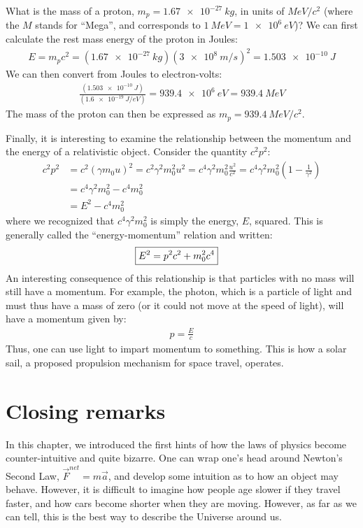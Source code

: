 \begin{example}{What is the mass of a proton, $m_p=\SI{1.67e-27}{kg}$, in units of $\si{MeV/c^2}$ (where the $M$ stands for ``Mega'', and corresponds to $\SI{1}{MeV}=\SI{1e6}{eV}$)?}
We can first calculate the rest mass energy of the proton in Joules:
\begin{align*}
E=m_pc^2=(\SI{1.67e-27}{kg})(\SI{3e8}{m/s})^2=\SI{1.503e-10}{J}
\end{align*}
We can then convert from Joules to electron-volts:
\begin{align*}
\frac{(\SI{1.503e-10}{J})}{(\SI{1.6e-19}{J/eV})}=\SI{939.4e6}{eV}=\SI{939.4}{MeV}
\end{align*}
The mass of the proton can then be expressed as $m_p=\SI{939.4}{MeV/c^2}$.
\end{example}

Finally, it is interesting to examine the relationship between the momentum and the energy of a relativistic object. Consider the quantity $c^2p^2$:
\begin{align*}
c^2p^2 &= c^2(\gamma m_0 u)^2=c^2\gamma^2m_0^2u^2=c^4\gamma^2m_0^2\frac{u^2}{c^2}=c^4\gamma^2m_0^2\left(1- \frac{1}{\gamma^2}\right)\\
&=c^4\gamma^2m_0^2 - c^4m_0^2\\
&=E^2-c^4m_0^2
\end{align*}
where we recognized that $c^4\gamma^2m_0^2$ is simply the energy, $E$, squared. This is generally called the ``energy-momentum'' relation and written:
\begin{align*}
\Aboxed{E^2=p^2c^2+m_0^2c^4}
\end{align*}
An interesting consequence of this relationship is that particles with no mass will still have a momentum. For example, the photon, which is a particle of light and must thus have a mass of zero (or it could not move at the speed of light), will have a momentum given by:
\begin{align*}
p=\frac{E}{c}
\end{align*}
Thus, one can use light to impart momentum to something. This is how a solar sail, a proposed propulsion mechanism for space travel, operates.

\section{Closing remarks}
In this chapter, we introduced the first hints of how the laws of physics become counter-intuitive and quite bizarre. One can wrap one's head around Newton's Second Law, $\vec F^{net}=m\vec a$, and develop some intuition as to how an object may behave. However, it is difficult to imagine how people age slower if they travel faster, and how cars become shorter when they are moving. However, as far as we can tell, this is the best way to describe the Universe around us. 

